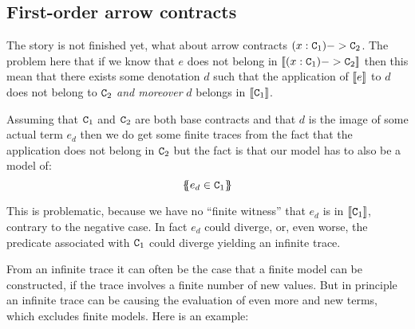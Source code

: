 \documentclass[preprint]{sigplanconf}
\begin{document}

\subsection{First-order arrow contracts}

The story is not finished yet, what about arrow contracts $(x:{\tt C}_1) -> {\tt C}_2$. The problem
here that if we know that $e$ does not belong in $[\![(x:{\tt C}_1) -> {\tt C}_2]\!]$ then this mean
that there exists some denotation $d$ such that the application of $[\![e]\!]$ to $d$ does
not belong to ${\tt C}_2$ {\em and moreover} $d$ belongs in $[\![{\tt C}_1]\!]$. 

Assuming that ${\tt C}_1$ and ${\tt C}_2$ are both base contracts and that $d$ is the image of some 
actual term $e_d$ then we do get some finite traces from the fact that the application does 
not belong in ${\tt C}_2$ but the fact is that our model has to also be a model of:
\[       \{\!\!\{e_d \in {\tt C}_1\}\!\!\} \]

This is problematic, because we have no ``finite witness'' that $e_d$ is in $[\![{\tt C}_1]\!]$, 
contrary to the negative case. In fact $e_d$ could diverge, or, even worse, the predicate 
associated with ${\tt C}_1$ could diverge yielding an infinite trace. 

From an infinite trace it can often be the case that a finite model can be constructed, if
the trace involves a finite number of new values. But in principle an infinite trace can
be causing the evaluation of even more and new terms, which excludes finite models. Here is 
an example:
\end{document}
